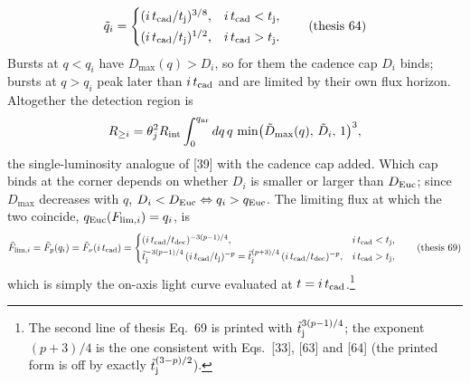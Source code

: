 \documentclass[11pt,a4paper]{article}
\newcommand{\tq}{\tilde{q}}
\newcommand{\tD}{\tilde{D}}
\newcommand{\tF}{\tilde{F}}
\newcommand{\ttj}{\tilde{t}_{\rm j}}
\newcommand{\Euc}{{\rm Euc}}
\newcommand{\nr}{{\rm nr}}
\newcommand{\Rint}{R_{\rm int}}
\newcommand{\tcad}{t_{\rm cad}}
\newcommand{\tdec}{t_{\rm dec}}
\newcommand{\tj}{t_{\rm j}}
\begin{document}
\begin{equation}
\tq_i=\begin{cases}(i\,\tcad/\tj)^{3/8}, & i\,\tcad<\tj,\\[2pt] (i\,\tcad/\tj)^{1/2}, & i\,\tcad>\tj .\end{cases}
\tag{thesis 64}
\end{equation}
Bursts at $q<q_i$ have $D_{\max}(q)>D_i$, so for them the cadence cap $D_i$ binds; bursts at $q>q_i$ peak later than $i\,\tcad$ and are limited by their own flux horizon. Altogether the detection region is
\begin{equation}
\label{eq:Rgeqi_exact}
R_{\geq i}=\theta_j^2\Rint\int_0^{q_\nr}dq\,q\,\min\bigl(\tD_{\max}(q),\,\tD_i,\,1\bigr)^3 ,
\end{equation}
the single-luminosity analogue of [39] with the cadence cap added. Which cap binds at the corner depends on whether $D_i$ is smaller or larger than $D_\Euc$; since $D_{\max}$ decreases with $q$, $D_i<D_\Euc\Leftrightarrow q_i>q_\Euc$. The limiting flux at which the two coincide, $q_\Euc(F_{{\rm lim},i})=q_i$, is
\begin{equation}
\label{eq:Flimi}
\tF_{{\rm lim},i}=\tF_p(q_i)=\tF_\nu(i\,\tcad)=\begin{cases}(i\,\tcad/\tdec)^{-3(p-1)/4}, & i\,\tcad<\tj,\\[2pt] \ttj^{-3(p-1)/4}\,(i\,\tcad/\tj)^{-p}=\ttj^{(p+3)/4}\,(i\,\tcad/\tdec)^{-p}, & i\,\tcad>\tj,\end{cases}
\tag{thesis 69}
\end{equation}
which is simply the on-axis light curve evaluated at $t=i\,\tcad$.\footnote{The second line of thesis Eq.~69 is printed with $\ttj^{3(p-1)/4}$; the exponent $(p+3)/4$ is the one consistent with Eqs.~[33], [63] and [64] (the printed form is off by exactly $\ttj^{(3-p)/2}$).}
\end{document}

